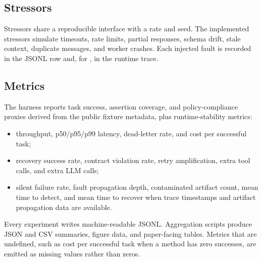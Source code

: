 \subsection{Stressors}

Stressors share a reproducible interface with a rate and seed. The implemented stressors simulate timeouts, rate limits, partial responses, schema drift, stale context, duplicate messages, and worker crashes. Each injected fault is recorded in the JSONL row and, for \system, in the runtime trace.

\subsection{Metrics}

The harness reports task success, assertion coverage, and policy-compliance proxies derived from the public fixture metadata, plus runtime-stability metrics:

\begin{itemize}
    \item throughput, p50/p95/p99 latency, dead-letter rate, and cost per successful task;
    \item recovery success rate, contract violation rate, retry amplification, extra tool calls, and extra LLM calls;
    \item silent failure rate, fault propagation depth, contaminated artifact count, mean time to detect, and mean time to recover when trace timestamps and artifact propagation data are available.
\end{itemize}

Every experiment writes machine-readable JSONL. Aggregation scripts produce JSON and CSV summaries, figure data, and paper-facing tables. Metrics that are undefined, such as cost per successful task when a method has zero successes, are emitted as missing values rather than zeros.
